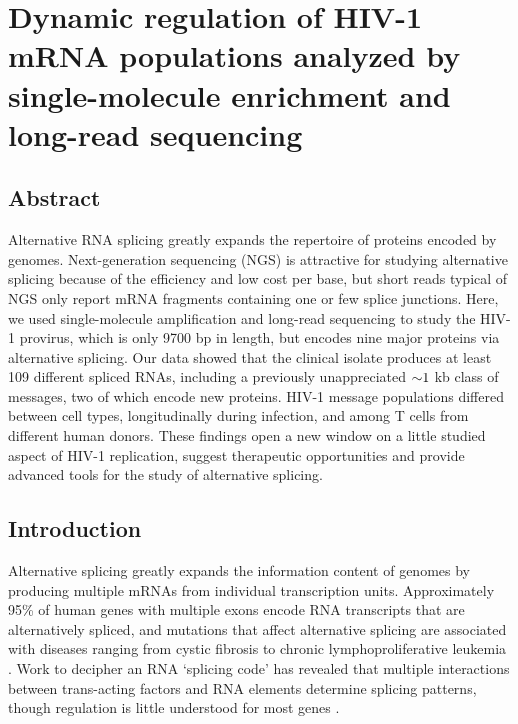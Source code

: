 \documentclass[../sherrill-Mix_thesis.tex]{subfiles}
\begin{document}
\graphicspath{{im/}{pacBio/im/}}

\chapter{Dynamic regulation of HIV-1 mRNA populations analyzed by single-molecule enrichment and long-read sequencing}
\label{chapPacBio}

\section{Abstract}
Alternative RNA splicing greatly expands the repertoire of proteins encoded by genomes. Next-generation sequencing (NGS) is attractive for studying alternative splicing because of the efficiency and low cost per base, but short reads typical of NGS only report mRNA fragments containing one or few splice junctions. Here, we used single-molecule amplification and long-read sequencing to study the HIV-1 provirus, which is only 9700 bp in length, but encodes nine major proteins via alternative splicing. Our data showed that the clinical isolate \hivEight{} produces at least 109 different spliced RNAs, including a previously unappreciated $\mathord{\sim}{}1$ kb class of messages, two of which encode new proteins. HIV-1 message populations differed between cell types, longitudinally during infection, and among T cells from different human donors. These findings open a new window on a little studied aspect of HIV-1 replication, suggest therapeutic opportunities and provide advanced tools for the study of alternative splicing. 

\section{Introduction}
Alternative splicing greatly expands the information content of genomes by producing multiple mRNAs from individual transcription units. Approximately 95\% of human genes with multiple exons encode RNA transcripts that are alternatively spliced, and mutations that affect alternative splicing are associated with diseases ranging from cystic fibrosis to chronic lymphoproliferative leukemia \citep{Pan2008,Wang2008,Pagani2005,Wang2007,Wang2011}. Work to decipher an RNA `splicing code' has revealed that multiple interactions between trans-acting factors and RNA elements determine splicing patterns, though regulation is little understood for most genes \citep{Barash2010}.
\end{document}
